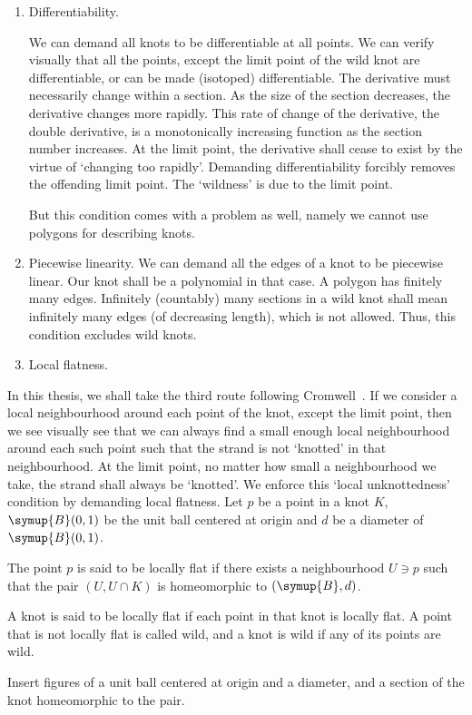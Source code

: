 \begin{enumerate}
    \item Differentiability.

    We can demand all knots to be differentiable at all points. We can verify visually that all the points, except the limit point of the wild knot are differentiable, or can be made (isotoped) differentiable. The derivative must necessarily change within a section. As the size of the section decreases, the derivative changes more rapidly. This rate of change of the derivative, the double derivative, is a monotonically increasing function as the section number increases. At the limit point, the derivative shall cease to exist by the virtue of `changing too rapidly'. Demanding differentiability forcibly removes the offending limit point. The `wildness' is due to the limit point.

    But this condition comes with a problem as well, namely we cannot use polygons for describing knots.
    \item Piecewise linearity.
    We can demand all the edges of a knot to be piecewise linear. Our knot shall be a polynomial in that case. A polygon has finitely many edges. Infinitely (countably) many sections in a wild knot shall mean infinitely many edges (of decreasing length), which is not allowed. Thus, this condition excludes wild knots.
    \item Local flatness.
\end{enumerate}
In this thesis, we shall take the third route following Cromwell~\cite[chp.~1]{cromwell}. If we consider a local neighbourhood around each point of the knot, except the limit point, then we see visually see that we can always find a small enough local neighbourhood around each such point such that the strand is not `knotted' in that neighbourhood. At the limit point, no matter how small a neighbourhood we take, the strand shall always be `knotted'. We enforce this `local unknottedness' condition by demanding local flatness. Let \(p\) be a point in a knot \(K\), \(\symup{B}(0, 1)\) be the unit ball centered at origin and \(d\) be a diameter of \(\symup{B}(0, 1)\).
\begin{defn}
    The point \(p\) is said to be locally flat if there exists a neighbourhood \(U \ni p\) such that the pair \((U, U \cap K)\) is homeomorphic to \((\symup{B}, d)\).

    A knot is said to be locally flat if each point in that knot is locally flat. A point that is not locally flat is called wild, and a knot is wild if any of its points are wild.
\end{defn}
Insert figures of a unit ball centered at origin and a diameter, and a section of the knot homeomorphic to the pair.

